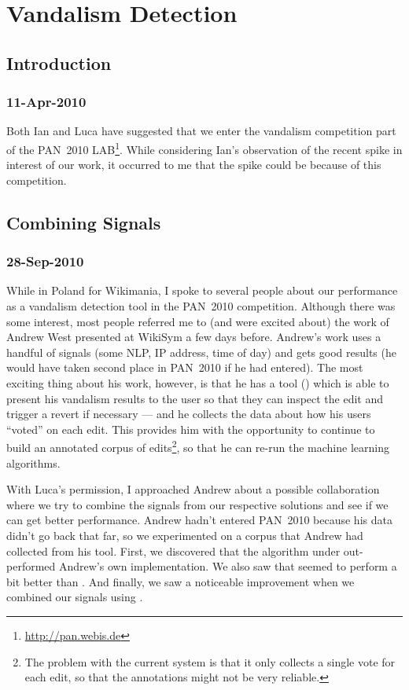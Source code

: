 \chapter{Vandalism Detection}

\section{Introduction}

\subsection{11-Apr-2010}

Both Ian and Luca have suggested that we enter the vandalism competition
part of the PAN~2010 LAB\footnote{\url{http://pan.webis.de}}.
While considering Ian's observation of the recent spike in
interest of our work, it occurred to me that the spike could
be because of this competition.

\section{Combining Signals}

\subsection{28-Sep-2010}

While in Poland for Wikimania, I spoke to several people about our
performance as a vandalism detection tool in the PAN~2010 competition.
Although there was some interest, most people referred me to (and were
excited about) the work of Andrew West presented at WikiSym a few days before.
Andrew's work uses a handful of signals (\eg some NLP, IP address, time of
day) and gets good results (he would have taken second place in
PAN~2010 if he had entered).
The most exciting thing about his work, however, is that he has a tool
() which is able to present his vandalism results to
the user so that they can inspect the edit and trigger a revert if
necessary --- and he collects the data about how his users ``voted''
on each edit.
This provides him with the opportunity to continue to build an
annotated corpus of edits\footnote{The problem with the current system
is that it only collects a single vote for each edit, so that the
annotations might not be very reliable.}, so that he can re-run the
machine learning algorithms.

With Luca's permission, I approached Andrew about a possible
collaboration where we try to combine the signals from our respective
solutions and see if we can get better performance.
Andrew hadn't entered PAN~2010 because his data didn't go back that
far, so we experimented on a corpus that Andrew had collected from
his tool.
First, we discovered that the  algorithm under
 out-performed Andrew's own 
implementation.
We also saw that \wikitrust seemed to perform a bit better than
.
And finally, we saw a noticeable improvement when we combined our
signals using .

